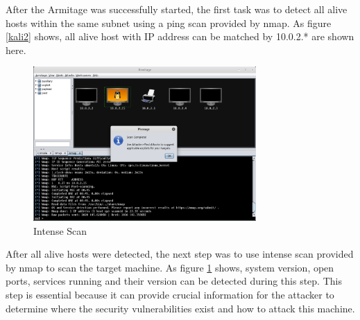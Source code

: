 \documentclass{article}
\begin{document}
After the Armitage was successfully started, the first task was to detect all alive hosts within the 
same subnet using a ping scan provided by nmap. As figure \ref{kali2} shows, all alive host with IP address 
can be matched by 10.0.2.* are shown here.

\begin{figure}[H]
  \includegraphics[width=8.5cm]{kali3}
  \caption{Intense Scan}
  \label{kali3}
\end{figure}

After all alive hosts were detected, the next step was to use intense scan provided by nmap to scan the 
target machine. As figure \ref{kali3} shows, system version, open ports, services running and their version 
can be detected during this step. This step is essential because it can provide crucial information 
for the attacker to determine where the security vulnerabilities exist and how to attack this machine.
\end{document}
